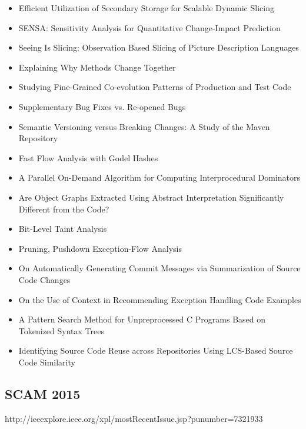 {\begin{itemize}[itemsep=-1ex]
  \item Efficient Utilization of Secondary Storage for Scalable Dynamic Slicing
  \item SENSA: Sensitivity Analysis for Quantitative Change-Impact Prediction
  \item Seeing Is Slicing: Observation Based Slicing of Picture Description Languages
  \item Explaining Why Methods Change Together
  \item Studying Fine-Grained Co-evolution Patterns of Production and Test Code
  \item Supplementary Bug Fixes vs. Re-opened Bugs
  \item Semantic Versioning versus Breaking Changes: A Study of the Maven Repository
  \item Fast Flow Analysis with Godel Hashes
  \item A Parallel On-Demand Algorithm for Computing Interprocedural Dominators
  \item Are Object Graphs Extracted Using Abstract Interpretation Significantly Different from the Code?
  \item Bit-Level Taint Analysis
  \item Pruning, Pushdown Exception-Flow Analysis
  \item On Automatically Generating Commit Messages via Summarization of Source Code Changes
  \item On the Use of Context in Recommending Exception Handling Code Examples
  \item A Pattern Search Method for Unpreprocessed C Programs Based on Tokenized Syntax Trees
  \item Identifying Source Code Reuse across Repositories Using LCS-Based Source Code Similarity
\end{itemize}
}

\subsection{SCAM 2015}

http://ieeexplore.ieee.org/xpl/mostRecentIssue.jsp?punumber=7321933

